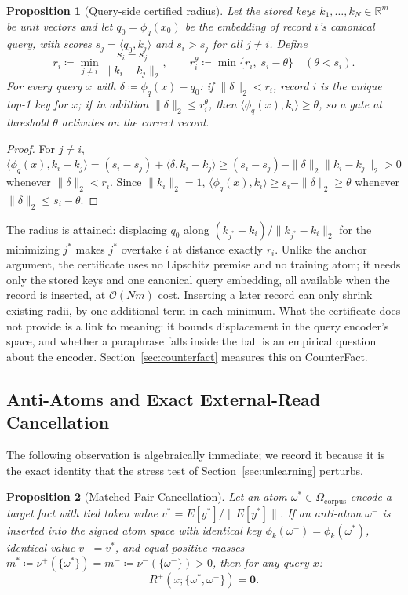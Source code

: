 \documentclass[preprint,12pt]{elsarticle}
\newtheorem{proposition}{Proposition}
\newcommand{\R}{\mathbb{R}}
\newcommand{\Om}{\Omega}
\begin{document}
\begin{proposition}[Query-side certified radius]
\label{prop:query_radius}
Let the stored keys $k_1,\dots,k_N\in\R^m$ be unit vectors and let $q_0=\phi_q(x_0)$ be the embedding of record $i$'s canonical query, with scores $s_j=\langle q_0,k_j\rangle$ and $s_i>s_j$ for all $j\ne i$. Define
\[
  r_i \coloneqq \min_{j\ne i}\frac{s_i-s_j}{\|k_i-k_j\|_2}, \qquad r_i^{\theta}\coloneqq\min\{r_i,\; s_i-\theta\}\quad(\theta<s_i).
\]
For every query $x$ with $\delta\coloneqq\phi_q(x)-q_0$: if $\|\delta\|_2<r_i$, record $i$ is the unique top-1 key for $x$; if in addition $\|\delta\|_2\le r_i^{\theta}$, then $\langle\phi_q(x),k_i\rangle\ge\theta$, so a gate at threshold $\theta$ activates on the correct record.
\end{proposition}

\begin{proof}
For $j\ne i$, $\langle\phi_q(x),k_i-k_j\rangle=(s_i-s_j)+\langle\delta,k_i-k_j\rangle\ge(s_i-s_j)-\|\delta\|_2\|k_i-k_j\|_2>0$ whenever $\|\delta\|_2<r_i$. Since $\|k_i\|_2=1$, $\langle\phi_q(x),k_i\rangle\ge s_i-\|\delta\|_2\ge\theta$ whenever $\|\delta\|_2\le s_i-\theta$. \qedhere
\end{proof}

The radius is attained: displacing $q_0$ along $(k_{j^*}-k_i)/\|k_{j^*}-k_i\|_2$ for the minimizing $j^*$ makes $j^*$ overtake $i$ at distance exactly $r_i$. Unlike the anchor argument, the certificate uses no Lipschitz premise and no training atom; it needs only the stored keys and one canonical query embedding, all available when the record is inserted, at $\mathcal O(Nm)$ cost. Inserting a later record can only shrink existing radii, by one additional term in each minimum. What the certificate does not provide is a link to meaning: it bounds displacement in the query encoder's space, and whether a paraphrase falls inside the ball is an empirical question about the encoder. Section~\ref{sec:counterfact} measures this on CounterFact.

\subsection{Anti-Atoms and Exact External-Read Cancellation}

The following observation is algebraically immediate; we record it because it is the exact identity that the stress test of Section~\ref{sec:unlearning} perturbs.

\begin{proposition}[Matched-Pair Cancellation]
\label{prop:unlearning}
Let an atom $\omega^* \in \Om_{\mathrm{corpus}}$ encode a target fact with tied token value $v^* = E[y^*] / \|E[y^*]\|$. If an anti-atom $\omega^-$ is inserted into the signed atom space with identical key $\phi_k(\omega^-) = \phi_k(\omega^*)$, identical value $v^- = v^*$, and equal positive masses $m^* \coloneqq \nu^+(\{\omega^*\}) = m^- \coloneqq \nu^-(\{\omega^-\}) > 0$, then for any query $x$:
\[
  R^{\pm}(x; \{\omega^*, \omega^-\}) = \mathbf{0}.
\]
\end{proposition}
\end{document}
